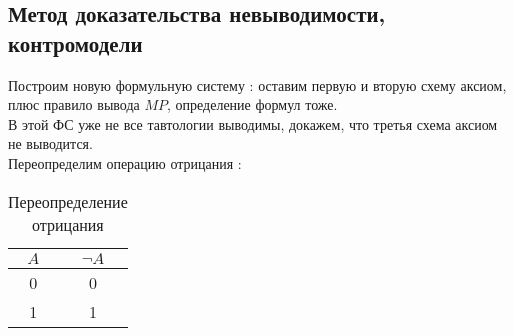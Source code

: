 \subsection{Метод доказательства невыводимости, контромодели}
Построим новую формульную систему : оставим первую и вторую схему аксиом, плюс правило вывода $MP$, определение формул тоже.\\
В этой ФС уже не все тавтологии выводимы, докажем, что третья схема аксиом не выводится.\\
Переопределим операцию отрицания :
\begin{table}[!h]
    \centering
    \begin{tabular}{c|c}
        $A$ & $\neg A$  \\
        \hline
         0 & 0 \\
         1 & 1 \\
    \end{tabular}
    \caption{Переопределение отрицания}
    \label{tab:my_label}
\end{table}

